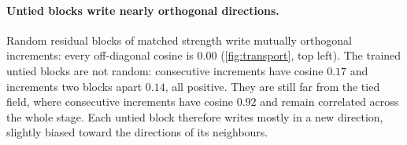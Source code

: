 \begin{table}[t]
    \centering
    \caption{Basis-independent transport statistics of stage~3, mean over $500$ images
    (std across images $\le 0.021$ for straightness and $\le 0.035$ for cosines).
    Str.: $\|x_T-x_0\|$ over path length (arc at $R{=}100$, chords at $R{=}1$);
    chords: $\|x_T-x_0\|/\sum_k\|\Delta x_k\|$;
    $\overline{\cos}$: mean off-diagonal cosine;
    $E$: opposed fraction; align: mean $\cos(\Delta x_k,x_T-x_0)$;
    $t_{50}$: first $t$ with $p(t)\ge 0.5$.}
    \label{tab:coherence}
    \scriptsize
    \setlength{\tabcolsep}{2.2pt}
\end{table}

\paragraph{Untied blocks write nearly orthogonal directions.}
Random residual blocks of matched strength write mutually orthogonal increments:
every off-diagonal cosine is $0.00$ (\cref{fig:transport}, top left).
The trained untied blocks are not random: consecutive increments have cosine
$0.17$ and increments two blocks apart $0.14$, all positive.
They are still far from the tied field, where consecutive increments have cosine
$0.92$ and remain correlated across the whole stage.
Each untied block therefore writes mostly in a new direction, slightly biased toward
the directions of its neighbours.

